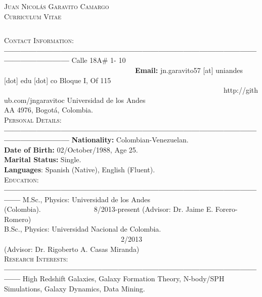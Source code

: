 \documentclass[letterpaper]{article}
\begin{document}
\begin{center}
\textsc{\LARGE Juan Nicol\'as Garavito Camargo}\\
\textsc{\large Curriculum Vitae}\\
\end{center}

$    $


\textsc{\Large Contact Information:}\\
{\bf---------------------------------------------------------------------------------------------------------------------}
Calle 18A\# 1- 10 \indent \ \ \ \ \ \ \ \ \ \ \ \ \ \ \ \ \ \ \ \ \ \ \ \ \ \ \ \ \ \ \ \ \ \  \ \  \ {\bf Email:} jn.garavito57 [at] uniandes [dot] edu [dot] co       
Bloque I, Of 115 \indent \ \ \ \ \ \ \ \ \ \ \ \ \ \ \ \ \ \ \ \ \ \ \ \ \ \ \ \ \ \ \ \ \ \ \ \ \ \ \ \ \ \ \ \ \ \ \ \ \ \ \ \ \ \ \ \ \ \ \ \ \ \    http://github.com/jngaravitoc            
Universidad de los Andes\\
AA 4976, Bogot\'a, Colombia.\\
	
\indent \textsc{\Large Personal Details:}\\
{\bf---------------------------------------------------------------------------------------------------------------------}
{\bf \large Nationality:} \large Colombian-Venezuelan.\\
{\bf Date of Birth:} 02/October/1988, Age 25.\\
{\bf Marital Status:} Single.\\
{\bf Languages}: Spanish (Native), English (Fluent).\\


\textsc{\Large Education:}\\
{\bf---------------------------------------------------------------------------------------------------}
M.Sc., Physics: Universidad de los Andes (Colombia).\indent \ \ \ \ \ \ \ \ \ \ \ \ \ \ \  8/2013-present
(Advisor: Dr. Jaime E. Forero-Romero)\\
B.Sc., Physics: Universidad Nacional de Colombia. \indent \ \ \ \ \ \ \ \ \ \ \ \ \ \ \ \ \ \ \ \ \ \ \ \ \ \ \ \ \ \ \ \ \ 2/2013\\
(Advisor: Dr. Rigoberto A. Casas Miranda)\\

\textsc{\Large Research Interests:}\\
{\bf---------------------------------------------------------------------------------------------------}
High Redshift Galaxies, Galaxy Formation Theory, N-body/SPH Simulations, Galaxy Dynamics, Data Mining.\\
\end{document}
